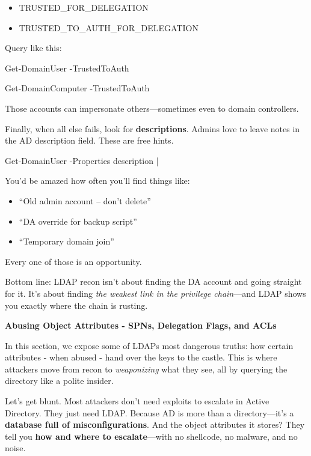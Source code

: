 \begin{itemize}
    \item TRUSTED\_FOR\_DELEGATION

    \item TRUSTED\_TO\_AUTH\_FOR\_DELEGATION

\end{itemize}
Query like this:

Get-DomainUser -TrustedToAuth

Get-DomainComputer -TrustedToAuth

Those accounts can impersonate others—sometimes even to domain controllers.

Finally, when all else fails, look for \textbf{descriptions}. Admins love to leave notes in the AD description field. These are free hints.

Get-DomainUser -Properties description |

You’d be amazed how often you’ll find things like:

\begin{itemize}
    \item “Old admin account – don’t delete”

    \item “DA override for backup script”

    \item “Temporary domain join”

\end{itemize}
Every one of those is an opportunity.

Bottom line: LDAP recon isn’t about finding the DA account and going straight for it. It’s about finding \textit{the weakest link in the privilege chain}—and LDAP shows you exactly where the chain is rusting.

\textbf{Abusing Object Attributes - SPNs, Delegation Flags, and ACLs}

In this section, we expose some of LDAPs most dangerous truths: how certain attributes - when abused - hand over the keys to the castle. This is where attackers move from recon to \textit{weaponizing} what they see, all by querying the directory like a polite insider.

Let’s get blunt. Most attackers don’t need exploits to escalate in Active Directory. They just need LDAP. Because AD is more than a directory—it’s a \textbf{database full of misconfigurations}. And the object attributes it stores? They tell you \textbf{how and where to escalate}—with no shellcode, no malware, and no noise.

